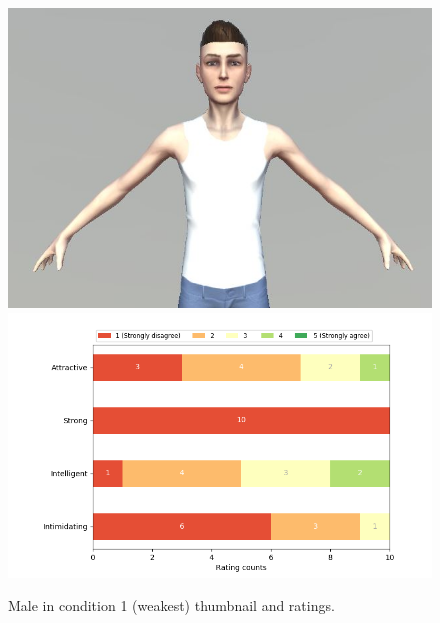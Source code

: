 \begin{figure}[H]
  \includegraphics[width=\linewidth]{Images/Males/13.JPG}
\endminipage\hfill
{}
  \includegraphics[width=\linewidth]{Survey/avatar_m_experiment1.png}
\endminipage\hfill
\caption{Male in condition 1 (weakest) thumbnail and ratings.}
\end{figure}

